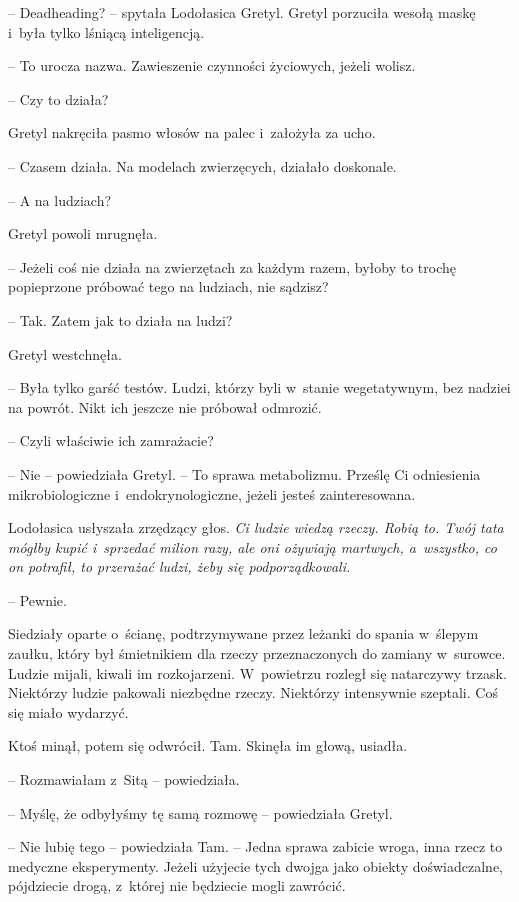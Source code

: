 \documentclass[oneside,polish,11pt,sfheadings]{mwbk}
\begin{document}
-- Deadheading? -- spytała Lodołasica Gretyl. Gretyl porzuciła wesołą
maskę i~była tylko lśniącą inteligencją.

-- To urocza nazwa. Zawieszenie czynności życiowych, jeżeli wolisz.

-- Czy to działa?

Gretyl nakręciła pasmo włosów na palec i~założyła za ucho. 

-- Czasem
działa. Na modelach zwierzęcych, działało doskonale.

-- A na ludziach?

Gretyl powoli mrugnęła. 

-- Jeżeli coś nie działa na zwierzętach za każdym
razem, byłoby to trochę popieprzone próbować tego na ludziach, nie
sądzisz?

-- Tak. Zatem jak to działa na ludzi?

Gretyl westchnęła. 

-- Była tylko garść testów. Ludzi, którzy byli w~stanie wegetatywnym, bez nadziei na powrót. Nikt ich jeszcze nie
próbował odmrozić.

-- Czyli właściwie ich zamrażacie?

-- Nie -- powiedziała Gretyl. -- To sprawa metabolizmu. Prześlę Ci
odniesienia mikrobiologiczne i~endokrynologiczne, jeżeli jesteś
zainteresowana.

Lodołasica usłyszała zrzędzący głos. \textit{Ci ludzie wiedzą rzeczy.
Robią to. Twój tata mógłby kupić i~sprzedać milion razy, ale oni
ożywiają martwych, a~wszystko, co on potrafił, to przerażać ludzi, żeby
się podporządkowali.} 

-- Pewnie.

Siedziały oparte o~ścianę, podtrzymywane przez leżanki do spania w~ślepym zaułku, który był śmietnikiem dla rzeczy przeznaczonych do
zamiany w~surowce. Ludzie mijali, kiwali im rozkojarzeni. W~powietrzu
rozległ się natarczywy trzask. Niektórzy ludzie pakowali niezbędne
rzeczy. Niektórzy intensywnie szeptali. Coś się miało wydarzyć.

Ktoś minął, potem się odwrócił. Tam. Skinęła im głową, usiadła.

-- Rozmawiałam z~Sitą -- powiedziała.

-- Myślę, że odbyłyśmy tę samą rozmowę -- powiedziała Gretyl.

-- Nie lubię tego -- powiedziała Tam. -- Jedna sprawa zabicie wroga, inna
rzecz to medyczne eksperymenty. Jeżeli użyjecie tych dwojga jako obiekty
doświadczalne, pójdziecie drogą, z~której nie będziecie mogli zawrócić.
\end{document}
